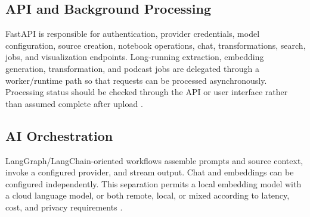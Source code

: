 \documentclass[conference]{IEEEtran}
\begin{document}
\subsection{API and Background Processing}
FastAPI is responsible for authentication, provider credentials, model configuration, source creation, notebook operations, chat, transformations, search, jobs, and visualization endpoints. Long-running extraction, embedding generation, transformation, and podcast jobs are delegated through a worker/runtime path so that requests can be processed asynchronously. Processing status should be checked through the API or user interface rather than assumed complete after upload \cite{docintel}.

\subsection{AI Orchestration}
LangGraph/LangChain-oriented workflows assemble prompts and source context, invoke a configured provider, and stream output. Chat and embeddings can be configured independently. This separation permits a local embedding model with a cloud language model, or both remote, local, or mixed according to latency, cost, and privacy requirements \cite{langgraph,docintel}.
\end{document}
